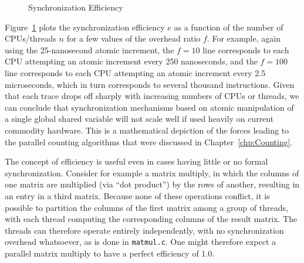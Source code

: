 \begin{figure}[tbp]
\begin{center}
\end{center}
\caption{Synchronization Efficiency}
\label{fig:SMPdesign:Synchronization Efficiency}
\end{figure}

Figure~\ref{fig:SMPdesign:Synchronization Efficiency} plots the synchronization
efficiency $e$ as a function of the number of CPUs/threads $n$ for
a few values of the overhead ratio $f$.
For example, again using the 25-nanosecond atomic increment, the
$f=10$ line corresponds to each CPU attempting an atomic increment
every 250 nanoseconds, and the $f=100$ line corresponds to each
CPU attempting an atomic increment every 2.5 microseconds,
which in turn corresponds to several thousand instructions.
Given that each trace drops off sharply with increasing numbers of
CPUs or threads, we can conclude that
synchronization mechanisms based on
atomic manipulation of a single global shared variable will not
scale well if used heavily on current commodity hardware.
This is a mathematical depiction of the forces leading to the parallel
counting algorithms that were discussed in Chapter~\ref{chp:Counting}.

The concept of efficiency is useful even in cases having little or
no formal synchronization.
Consider for example a matrix multiply, in which the columns of one
matrix are multiplied (via ``dot product'') by the rows of another,
resulting in an entry in a third matrix.
Because none of these operations conflict, it is possible to partition
the columns of the first matrix among a group of threads, with each thread
computing the corresponding columns of the result matrix.
The threads can therefore operate entirely independently, with no
synchronization overhead whatsoever, as is done in
\texttt{matmul.c}.
One might therefore expect a parallel matrix multiply to have a
perfect efficiency of 1.0.

